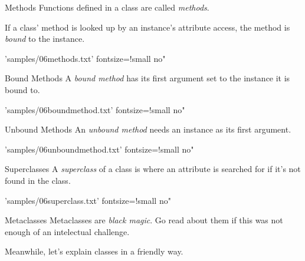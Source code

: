 \documentclass{pyslides}
\begin{document}
\begin{frame}[fragile]{Methods}
Functions defined in a class are called \emph{methods}.

If a class' method is looked up by an instance's attribute access, the method is \emph{bound} to the instance.

 'samples/06methods.txt' fontsize=!small no"

\end{frame}

\begin{frame}[fragile]{Bound Methods}
A \emph{bound method} has its first argument set to the instance it is bound to.

 'samples/06boundmethod.txt' fontsize=!small no"

\end{frame}

\begin{frame}[fragile]{Unbound Methods}
An \emph{unbound method} needs an instance as its first argument.

 'samples/06unboundmethod.txt' fontsize=!small no"

\end{frame}

\begin{frame}[fragile]{Superclasses}
A \emph{superclass} of a class is where an attribute is searched for if it's not found in the class.

 'samples/06superclass.txt' fontsize=!small no"

\end{frame}

\begin{frame}[fragile]{Metaclasses}
Metaclasses are \emph{black magic}. Go read about them if this was not enough of an intelectual challenge.

\bigskip

Meanwhile, let's explain classes in a friendly way.

\end{frame}
\end{document}
